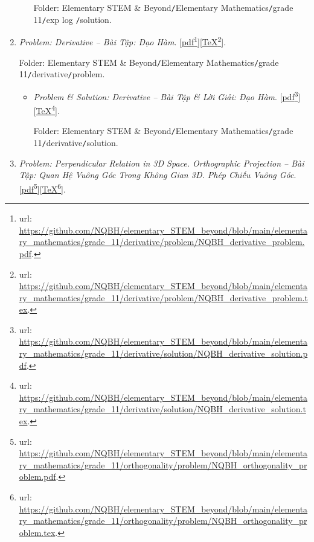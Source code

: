 \documentclass[12pt,twoside]{book}
\begin{document}
\begin{enumerate}
\begin{itemize}
		Folder: {\sf Elementary STEM \& Beyond{\tt/}Elementary Mathematics{\tt/}grade 11{\tt/}exp log {\tt/}solution}.
	\end{itemize}
	\item {\it Problem: Derivative -- Bài Tập: Đạo Hàm}. [\href{https://github.com/NQBH/elementary_STEM_beyond/blob/main/elementary_mathematics/grade_11/derivative/problem/NQBH_derivative_problem.pdf}{pdf}\footnote{{\sc url}: \url{https://github.com/NQBH/elementary_STEM_beyond/blob/main/elementary_mathematics/grade_11/derivative/problem/NQBH_derivative_problem.pdf}.}][\href{https://github.com/NQBH/elementary_STEM_beyond/blob/main/elementary_mathematics/grade_11/derivative/problem/NQBH_derivative_problem.tex}{\TeX}\footnote{{\sc url}: \url{https://github.com/NQBH/elementary_STEM_beyond/blob/main/elementary_mathematics/grade_11/derivative/problem/NQBH_derivative_problem.tex}.}].
	
	Folder: {\sf Elementary STEM \& Beyond{\tt/}Elementary Mathematics{\tt/}grade 11{\tt/}derivative{\tt/}problem}.
	\begin{itemize}
		\item {\it Problem \& Solution: Derivative -- Bài Tập \& Lời Giải: Đạo Hàm}. [\href{https://github.com/NQBH/elementary_STEM_beyond/blob/main/elementary_mathematics/grade_11/derivative/solution/NQBH_derivative_solution.pdf}{pdf}\footnote{{\sc url}: \url{https://github.com/NQBH/elementary_STEM_beyond/blob/main/elementary_mathematics/grade_11/derivative/solution/NQBH_derivative_solution.pdf}.}][\href{https://github.com/NQBH/elementary_STEM_beyond/blob/main/elementary_mathematics/grade_11/derivative/solution/NQBH_derivative_solution.tex}{\TeX}\footnote{{\sc url}: \url{https://github.com/NQBH/elementary_STEM_beyond/blob/main/elementary_mathematics/grade_11/derivative/solution/NQBH_derivative_solution.tex}.}].
		
		Folder: {\sf Elementary STEM \& Beyond{\tt/}Elementary Mathematics{\tt/}grade 11{\tt/}derivative{\tt/}solution}.
	\end{itemize}
	\item {\it Problem: Perpendicular Relation in 3D Space. Orthographic Projection -- Bài Tập: Quan Hệ Vuông Góc Trong Không Gian 3D. Phép Chiếu Vuông Góc}. [\href{https://github.com/NQBH/elementary_STEM_beyond/blob/main/elementary_mathematics/grade_11/orthogonality/problem/NQBH_orthogonality_problem.pdf}{pdf}\footnote{{\sc url}: \url{https://github.com/NQBH/elementary_STEM_beyond/blob/main/elementary_mathematics/grade_11/orthogonality/problem/NQBH_orthogonality_problem.pdf}.}][\href{https://github.com/NQBH/elementary_STEM_beyond/blob/main/elementary_mathematics/grade_11/orthogonality/problem/NQBH_orthogonality_problem.tex}{\TeX}\footnote{{\sc url}: \url{https://github.com/NQBH/elementary_STEM_beyond/blob/main/elementary_mathematics/grade_11/orthogonality/problem/NQBH_orthogonality_problem.tex}.}].
	

\end{enumerate}
\end{document}
